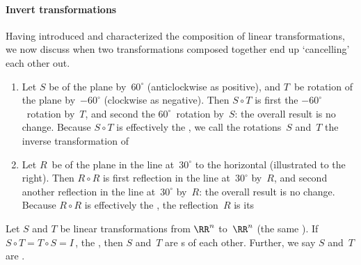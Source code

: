 \paragraph{Invert transformations}
Having introduced and characterized the composition of linear transformations, we now discuss when two transformations composed together end up `cancelling' each other out.

\begin{example} 
\begin{enumerate}
\item Let \(S\) be  of the plane by~\(60^\circ\) (anticlockwise as positive), and \(T\)~be rotation of the plane by~\(-60^\circ\) (clockwise as negative).
Then \(S\circ T\) is first the \(-60^\circ\)~rotation by~\(T\), and second the \(60^\circ\)~rotation by~\(S\): the overall result is no change.
Because \(S\circ T\) is effectively the , we call the rotations~\(S\) and~\(T\) the inverse transformation of 

\item 
\begin{figbox}{}%
Let \(R\)~be  of the plane in the line at~\(30^\circ\) to the horizontal (illustrated to the right).  
Then \(R\circ R\) is first reflection in the line at~\(30^\circ\) by~\(R\), and second another reflection in the line at~\(30^\circ\) by~\(R\): the overall result is no change.
Because \(R\circ R\) is effectively the , the reflection~\(R\) is its 
\end{figbox}
\end{enumerate}
\end{example}



\begin{definition} \label{def:invLT} 
Let \(S\) and \(T\) be linear transformations from \(\RR^n\) to~\(\RR^n\) (the same ).
If \(S\circ T=T\circ S=I\)\,, the , then \(S\) and~\(T\) are s of each other.  
Further, we say \(S\) and~\(T\) are .
\end{definition}



